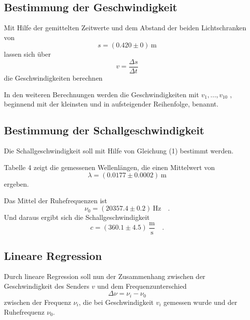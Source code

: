 \subsection{Bestimmung der Geschwindigkeit}


Mit Hilfe der gemittelten Zeitwerte und dem Abstand der beiden Lichtschranken von
\begin{equation}
	s = (0.420 \pm 0)\ \text{m}
\end{equation}
lassen sich über
\begin{equation}
	v = \frac{\Delta s}{\Delta t}
\end{equation}
die Geschwindigkeiten berechnen

In den weiteren Berechnungen werden die Geschwindigkeiten mit $v_1,...,v_{10}$ , beginnend mit der kleinsten und in aufsteigender Reihenfolge, benannt.
\subsection{Bestimmung der Schallgeschwindigkeit}
Die Schallgeschwindigkeit soll mit Hilfe von Gleichung (1) bestimmt werden.

Tabelle 4 zeigt die gemessenen Wellenlängen, die einen Mittelwert von
\begin{equation}
	\lambda = (0.0177 \pm 0.0002)\ \text{m}
\end{equation}
ergeben.

Das Mittel der Ruhefrequenzen ist
\begin{equation}
	\nu_0 = (20357.4 \pm 0.2)\ \text{Hz}\quad .
\end{equation}
Und daraus ergibt sich die Schallgeschwindigkeit
\begin{equation}
	c = (360.1 \pm 4.5)\ \frac{\text{m}}{\text{s}} \quad .
\end{equation}

\subsection{Lineare Regression}
Durch lineare Regression soll nun der Zusammenhang zwischen der Geschwindigkeit des Senders $v$ und dem Frequenzunterschied
\begin{equation}
	\Delta\nu = \nu_i - \nu_0
\end{equation}
zwischen der Frequenz $\nu_i$, die bei Geschwindigkeit $v_i$ gemessen wurde und der Ruhefrequenz $\nu_0$.

